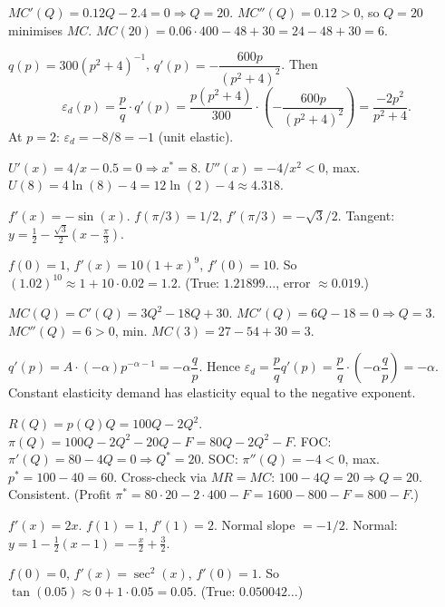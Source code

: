 \begin{solutions}
  \item $MC'(Q)=0.12Q-2.4=0\Rightarrow Q=20$. $MC''(Q)=0.12>0$, so $Q=20$
        minimises $MC$. $MC(20)=0.06\cdot400-48+30=24-48+30=6$.

  \item $q(p)=300(p^2+4)^{-1}$,
        $q'(p)=-\dfrac{600p}{(p^2+4)^2}$. Then
        \[
          \varepsilon_d(p)=\frac{p}{q}\cdot q'(p)
            =\frac{p(p^2+4)}{300}\cdot\left(-\frac{600p}{(p^2+4)^2}\right)
            =\frac{-2p^2}{p^2+4} .
        \]
        At $p=2$: $\varepsilon_d=-8/8=-1$ (unit elastic).

  \item $U'(x)=4/x-0.5=0\Rightarrow x^*=8$. $U''(x)=-4/x^2<0$, max.
        $U(8)=4\ln(8)-4=12\ln(2)-4\approx4.318$.

  \item $f'(x)=-\sin(x)$. $f(\pi/3)=1/2$, $f'(\pi/3)=-\sqrt3/2$. Tangent:
        $y=\frac12-\frac{\sqrt3}{2}\left(x-\frac{\pi}{3}\right)$.

  \item $f(0)=1$, $f'(x)=10(1+x)^9$, $f'(0)=10$. So
        $(1.02)^{10}\approx1+10\cdot0.02=1.2$. (True: $1.21899\ldots$,
        error $\approx0.019$.)

  \item $MC(Q)=C'(Q)=3Q^2-18Q+30$. $MC'(Q)=6Q-18=0\Rightarrow Q=3$.
        $MC''(Q)=6>0$, min. $MC(3)=27-54+30=3$.

  \item $q'(p)=A\cdot(-\alpha)p^{-\alpha-1}=-\alpha\dfrac{q}{p}$. Hence
        $\varepsilon_d=\dfrac{p}{q}q'(p)=\dfrac{p}{q}\cdot
        \left(-\alpha\dfrac{q}{p}\right)=-\alpha$. Constant elasticity
        demand has elasticity equal to the negative exponent.

  \item $R(Q)=p(Q)Q=100Q-2Q^2$. $\pi(Q)=100Q-2Q^2-20Q-F=80Q-2Q^2-F$. FOC:
        $\pi'(Q)=80-4Q=0\Rightarrow Q^*=20$. SOC: $\pi''(Q)=-4<0$, max.
        $p^*=100-40=60$. Cross-check via $MR=MC$: $100-4Q=20\Rightarrow
        Q=20$. Consistent. (Profit $\pi^*=80\cdot20-2\cdot400-F
        =1600-800-F=800-F$.)

  \item $f'(x)=2x$. $f(1)=1$, $f'(1)=2$. Normal slope $=-1/2$. Normal:
        $y=1-\frac12(x-1)=-\frac{x}{2}+\frac32$.

  \item $f(0)=0$, $f'(x)=\sec^2(x)$, $f'(0)=1$. So
        $\tan(0.05)\approx0+1\cdot0.05=0.05$. (True: $0.050042\ldots$)


\end{solutions}
